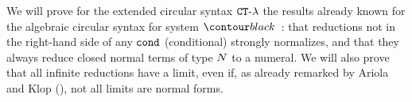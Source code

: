 We will prove for the extended circular syntax ${ {\tt CT}\mbox{-}\lambda}$ the results already
known for the algebraic circular syntax for system $\systemT$:
that reductions not in the right-hand side of any ${\tt cond}$ (conditional)
strongly normalizes, and that they always reduce closed normal terms of type ${N}$ to a numeral.
We will also prove that all infinite reductions have a limit, even if, as already remarked by 
Ariola and Klop (\cite{ARIOLA1997154}), not all limits are normal forms.




